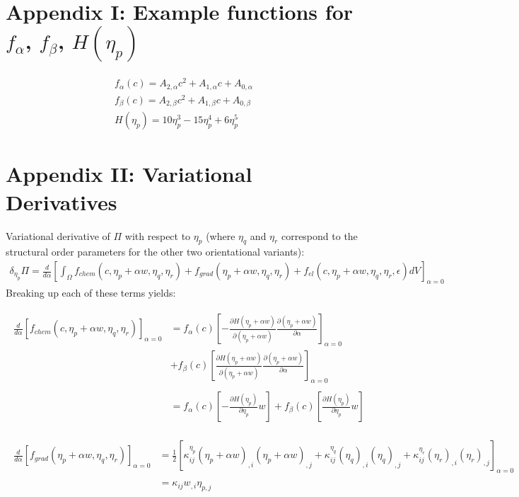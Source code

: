 \documentclass[11pt]{article}
\renewcommand{\=}[1]{\stackrel{#1}{=}} %
\theoremstyle{definition}
\theoremstyle{remark}
\begin{document}
\section{Appendix I: Example functions for $f_{\alpha}$, $f_{\beta}$, $H(\eta_p)$ }
\begin{gather}
f_{\alpha}(c) = A_{2, \alpha} c^2 + A_{1, \alpha} c + A_{0, \alpha} \\
f_{\beta}(c) = A_{2, \beta} c^2 + A_{1, \beta} c + A_{0, \beta} \\
H(\eta_p) = 10 \eta_p^3 - 15 \eta_p^4 + 6 \eta_p^5
\end{gather}

\section{Appendix II: Variational Derivatives}
Variational derivative of $\Pi$ with respect to $\eta_p$ (where $\eta_q$ and $\eta_r$ correspond to the structural order parameters for the other two orientational variants):
\begin{gather}
\delta_{\eta_p} \Pi  =  \frac{d}{d\alpha} \left[\int_{\Omega}  f_{chem}(c,\eta_p+\alpha w,\eta_q,\eta_r) + f_{grad}(\eta_p+\alpha w,\eta_q,\eta_r) + f_{el}(c,\eta_p+\alpha w,\eta_q,\eta_r,\epsilon) dV  \right]_{\alpha=0}
\end{gather}
Breaking up each of these terms yields:

\begin{align}
\begin{split}
\frac{d}{d\alpha} \left[ f_{chem}(c,\eta_p+\alpha w,\eta_q,\eta_r)\right]_{\alpha=0} &= f_{\alpha}(c) \left[  -\frac{\partial H(\eta_p+\alpha w)}{\partial (\eta_p + \alpha w)} \frac{\partial(\eta_p + \alpha w)}{\partial \alpha} \right]_{\alpha=0} \\
&+f_{\beta}(c)  \left[  \frac{\partial H(\eta_p+\alpha w)}{\partial (\eta_p + \alpha w)} \frac{\partial(\eta_p + \alpha w)}{\partial \alpha} \right]_{\alpha=0} \\
\\
&=f_{\alpha}(c) \left[  -\frac{\partial H(\eta_p)}{\partial \eta_p} w \right] 
+f_{\beta}(c) \left[  \frac{\partial H(\eta_p)}{\partial \eta_p } w \right] 
\end{split}
\end{align}

\begin{align}
\begin{split}
\frac{d}{d\alpha} \left[ f_{grad}(\eta_p+\alpha w,\eta_q,\eta_r)\right]_{\alpha=0} &= \frac{1}{2} \left[ \kappa_{ij}^{\eta_p} (\eta_p+\alpha w)_{,i}(\eta_p+\alpha w)_{,j} +\kappa_{ij}^{\eta_q} (\eta_q)_{,i}(\eta_q)_{,j} + \kappa_{ij}^{\eta_r} (\eta_r)_{,i}(\eta_r)_{,j}  \right]_{\alpha=0} \\
\\
&= \kappa_{ij} w_{,i} \eta_{p,j}
\end{split}
\end{align}
\end{document}
